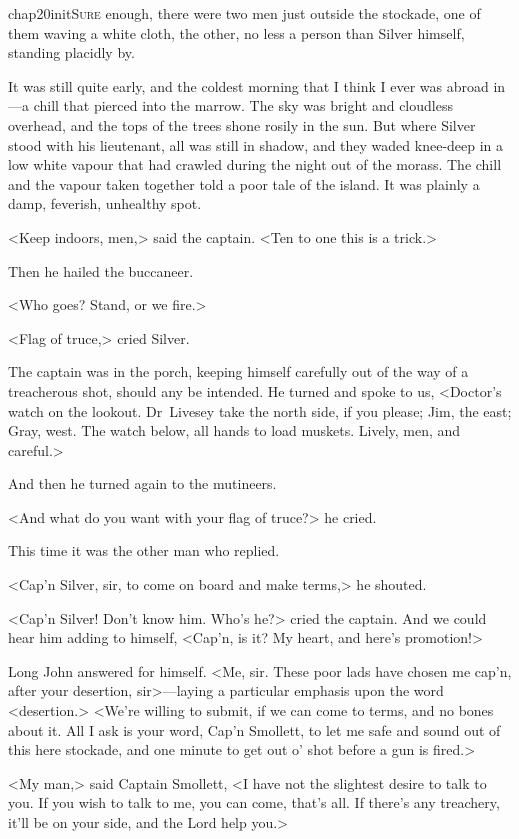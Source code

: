 
\lettrine{chap20initS}{ure} enough, there were two men just outside the stockade, one of them waving a white cloth, the other, no less a person than Silver himself, standing placidly by.

\zz
It was still quite early, and the coldest morning that I think I ever was abroad in—a chill that pierced into the marrow. The sky was bright and cloudless overhead, and the tops of the trees shone rosily in the sun. But where Silver stood with his lieutenant, all was still in shadow, and they waded knee-deep in a low white vapour that had crawled during the night out of the morass. The chill and the vapour taken together told a poor tale of the island. It was plainly a damp, feverish, unhealthy spot.

<Keep indoors, men,> said the captain. <Ten to one this is a trick.>

Then he hailed the buccaneer.

<Who goes? Stand, or we fire.>

<Flag of truce,> cried Silver.

The captain was in the porch, keeping himself carefully out of the way of a treacherous shot, should any be intended. He turned and spoke to us, <Doctor's watch on the lookout. Dr~Livesey take the north side, if you please; Jim, the east; Gray, west. The watch below, all hands to load muskets. Lively, men, and careful.>

And then he turned again to the mutineers.

<And what do you want with your flag of truce?> he cried.

This time it was the other man who replied.

<Cap'n Silver, sir, to come on board and make terms,> he shouted.

<Cap'n Silver! Don't know him. Who's he?> cried the captain. And we could hear him adding to himself, <Cap'n, is it? My heart, and here's promotion!>

Long John answered for himself. <Me, sir. These poor lads have chosen me cap'n, after your desertion, sir>—laying a particular emphasis upon the word <desertion.> <We're willing to submit, if we can come to terms, and no bones about it. All I ask is your word, Cap'n Smollett, to let me safe and sound out of this here stockade, and one minute to get out o' shot before a gun is fired.>

<My man,> said Captain Smollett, <I have not the slightest desire to talk to you. If you wish to talk to me, you can come, that's all. If there's any treachery, it'll be on your side, and the Lord help you.>

